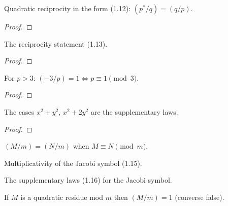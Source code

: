 \begin{theorem}[Exercise 1.7]
  \label{exr:s1_7}
  \leanok
  Quadratic reciprocity in the form (1.12): $(p^*/q) = (q/p)$.
\end{theorem}
\begin{proof}\end{proof}

\begin{theorem}[Exercise 1.8]
  \label{exr:s1_8}
  \leanok
  The reciprocity statement (1.13).
\end{theorem}
\begin{proof}\end{proof}

\begin{theorem}[Exercise 1.9(a)]
  \label{exr:s1_9_a}
  \leanok
  For $p>3$: $(-3/p)=1 \iff p \equiv 1 \pmod 3$.
\end{theorem}
\begin{proof}\end{proof}

\begin{theorem}[Exercise 1.9(b)]
  \label{exr:s1_9_b}
  \leanok
  The cases $x^2+y^2$, $x^2+2y^2$ are the supplementary laws.
\end{theorem}
\begin{proof}\end{proof}

\begin{theorem}[Exercise 1.10(a)]
  \label{exr:s1_10_a}
  \leanok
  $(M/m) = (N/m)$ when $M \equiv N \pmod m$.
\end{theorem}

\begin{theorem}[Exercise 1.10(b)]
  \label{exr:s1_10_b}
  \leanok
  Multiplicativity of the Jacobi symbol (1.15).
\end{theorem}

\begin{theorem}[Exercise 1.10(c)]
  \label{exr:s1_10_c}
  \leanok
  The supplementary laws (1.16) for the Jacobi symbol.
\end{theorem}

\begin{theorem}[Exercise 1.10(d)]
  \label{exr:s1_10_d}
  \leanok
  If $M$ is a quadratic residue mod $m$ then $(M/m)=1$ (converse false).
\end{theorem}

